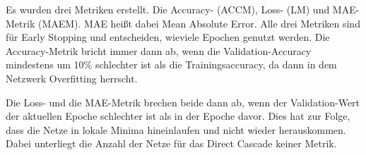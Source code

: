 Es wurden drei Metriken erstellt. 
Die Accuracy- (ACCM), Loss- (LM) und MAE-Metrik (MAEM). MAE heißt dabei Mean Absolute Error. 
Alle drei Metriken sind für Early Stopping und entscheiden, wieviele Epochen genutzt werden. 
Die Accuracy-Metrik bricht immer dann ab, wenn die Validation-Accuracy mindestens um 10\% 
schlechter ist als die Trainingsaccuracy, da dann in dem Netzwerk Overfitting herrscht.

Die Loss- und die MAE-Metrik brechen beide dann ab, wenn der Validation-Wert der aktuellen 
Epoche schlechter ist als in der Epoche davor. Dies hat zur Folge, dass die Netze in lokale 
Minima hineinlaufen und nicht wieder herauskommen. Dabei unterliegt die Anzahl der Netze für 
das Direct Cascade keiner Metrik.

